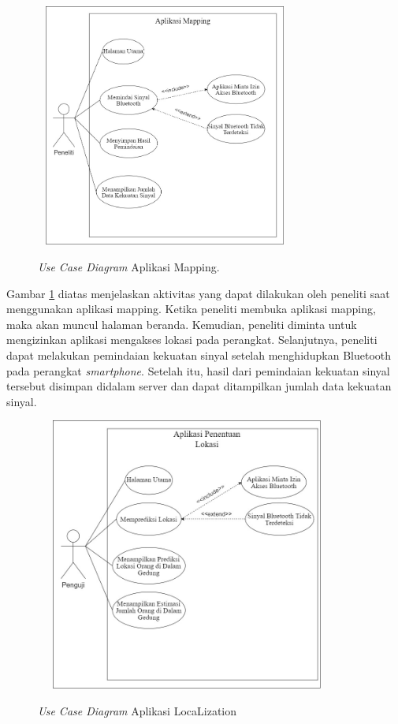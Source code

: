 \begin{figure}[H]
	\center
	\shadowbox
	{\includegraphics [width=8.5cm, height=8cm]{gambar/mapping}}
	\caption{\textit{Use Case Diagram} Aplikasi Mapping.}
	\label{usecasemapping}
\end{figure}

\par Gambar \ref{usecasemapping} diatas menjelaskan aktivitas yang dapat dilakukan oleh peneliti saat menggunakan aplikasi mapping. Ketika peneliti membuka aplikasi mapping, maka akan muncul halaman beranda. Kemudian, peneliti diminta untuk mengizinkan aplikasi mengakses lokasi pada perangkat. Selanjutnya, peneliti dapat melakukan pemindaian kekuatan sinyal setelah menghidupkan Bluetooth pada perangkat \textit{smartphone}. Setelah itu, hasil dari pemindaian kekuatan sinyal tersebut disimpan didalam server dan dapat ditampilkan jumlah data kekuatan sinyal.
\fancyhf{}
\fancyfoot[R]{\thepage}
\begin{figure}[H]
	\center
	\shadowbox
	{\includegraphics [width=10cm, height=9cm]{gambar/penentuanlokasi}}
	\caption{\textit{Use Case Diagram} Aplikasi LocaLization}
	\label{usecasedosen}
\end{figure}

